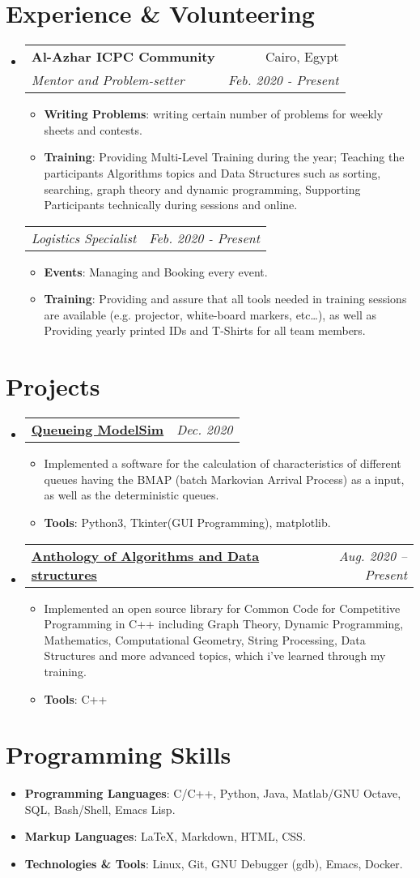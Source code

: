 \documentclass[letterpaper, 11pt]{article}
\makeatletter
\newcommand{\Item}[2]{\item\small{\textbf{#1}{#2 \vspace{-2pt}}}}
\newcommand{\SubSecListBeg}{\begin{itemize}[leftmargin=*]}
\newcommand{\SubSecListEnd}{\end{itemize}}
\newcommand{\ItemListBeg}{\begin{itemize}}
\newcommand{\ItemListEnd}{\end{itemize}\vspace{-5pt}}
\newcommand{\subsecfourtwoitalic}[4] {
	\vspace{-1pt}\item
	\begin{tabular*}{0.97\textwidth}[t]{l@{\extracolsep{\fill}}r}
		\textbf{#1} & #2 \\
		\textit{\small#3} & \textit{\small #4} \\
	\end{tabular*}\vspace{-5pt}
}
\newcommand{\subsubsectwoitalic}[2] {
	\begin{tabular*}{0.97\textwidth}{l@{\extracolsep{\fill}}r}
		\textit{\small#1} & \textit{\small #2} \\
	\end{tabular*}\vspace{-5pt}
}
\newcommand{\subsectwooneitalic}[2] {
	\vspace{-1pt}\item
	\begin{tabular*}{0.97\textwidth}[t]{l@{\extracolsep{\fill}}r}
		\textbf{#1} & \textit{\small #2} \\
	\end{tabular*}\vspace{-5pt}
}
\makeatother
\begin{document}
\section{Experience \& Volunteering}
\SubSecListBeg
	\subsecfourtwoitalic
	{Al-Azhar ICPC Community}{Cairo, Egypt}
	{Mentor and Problem-setter}{Feb. 2020 - Present}
      	\ItemListBeg
        	\Item{Writing Problems}
        	{: writing certain number of problems for weekly sheets and contests.}
		\Item{Training}
		{: Providing Multi-Level Training during the year; Teaching the participants Algorithms topics and Data Structures such as sorting, searching, graph theory and dynamic programming, Supporting Participants technically during sessions and online.}
      	\ItemListEnd
	\subsubsectwoitalic
	{Logistics Specialist}{Feb. 2020 - Present}
	\ItemListBeg
        	\Item{Events}
        	{: Managing and Booking every event.}
        	\Item{Training}
          	{: Providing and assure that all tools needed in training sessions are available (e.g. projector, white-board markers, etc…), as well as Providing yearly printed IDs and T-Shirts for all team members.}
      	\ItemListEnd
\SubSecListEnd


\section{Projects}
\SubSecListBeg
	\subsectwooneitalic
	{\faIcon{user-clock} \href{https://github.com/AbdeltwabMF/Queueing-ModelSim}{Queueing ModelSim}}{Dec. 2020}
	\ItemListBeg
		\Item{}{Implemented a software for the calculation of characteristics of different queues having the BMAP (batch Markovian Arrival Process) as a input, as well as the deterministic queues.}
		\Item{Tools}
		{: Python3, Tkinter(GUI Programming), matplotlib.}
	\ItemListEnd

	\subsectwooneitalic
	{\faIcon{laptop-code} \href{https://github.com/AbdeltwabMF/Anthology-of-Algorithms-and-Data-structures}{Anthology of Algorithms and Data structures}}{Aug. 2020 -- Present}
	\ItemListBeg
		\Item{}{Implemented an open source library for Common Code for Competitive Programming in C++ including Graph Theory, Dynamic Programming, Mathematics, Computational Geometry, String Processing, Data Structures and more advanced topics, which i've learned through my training.}
		\Item{Tools}
		{: C++}
	\ItemListEnd
\SubSecListEnd

\section{Programming Skills}
\SubSecListBeg
	\Item{Programming Languages}{: C/C++, Python, Java, Matlab/GNU Octave, SQL, Bash/Shell, Emacs Lisp.}
	\Item{Markup Languages}{: \LaTeX, Markdown, HTML, CSS.}
	\Item{Technologies \& Tools}{: Linux, Git, GNU Debugger (gdb), Emacs, Docker.}
\SubSecListEnd
\end{document}
